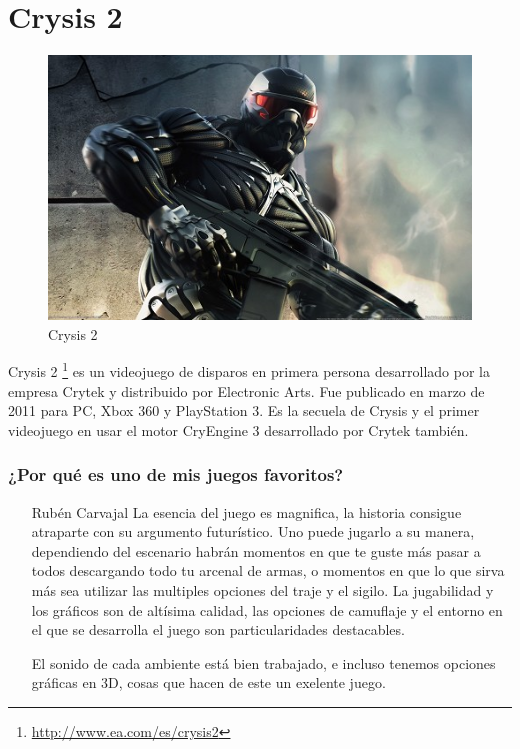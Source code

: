 \section{Crysis 2}

\begin{figure}[htbp]
\begin{center}
\includegraphics[width=.60\textwidth]{./imagenes/crysis2.jpg}
\caption{Crysis 2}
\label{Crysis 2}
\end{center}
\end{figure}
Crysis 2 \footnote{\url{http://www.ea.com/es/crysis2}} es un videojuego de disparos en primera persona desarrollado por la empresa Crytek y distribuido por Electronic Arts. Fue publicado en marzo de 2011 para PC, Xbox 360 y PlayStation 3. Es la secuela de Crysis y el primer videojuego en usar el motor CryEngine 3 desarrollado por Crytek también.

\subsubsection{¿Por qué es uno de mis juegos favoritos?}
\begin{itemize}
\item[Rubén Carvajal] La esencia del juego es magnifica, la historia consigue atraparte con su argumento futurístico.
Uno puede jugarlo a su manera, dependiendo del escenario habrán momentos en que te guste más pasar a todos descargando todo tu arcenal de armas, o momentos en que lo que sirva más sea utilizar las multiples opciones del traje y el sigilo.
La jugabilidad y los gráficos son de altísima calidad, las opciones de camuflaje y el entorno en el que se desarrolla el juego son particularidades destacables.

El sonido de cada ambiente está bien trabajado, e incluso tenemos opciones gráficas en 3D, cosas que hacen de este un exelente juego.
\end{itemize}